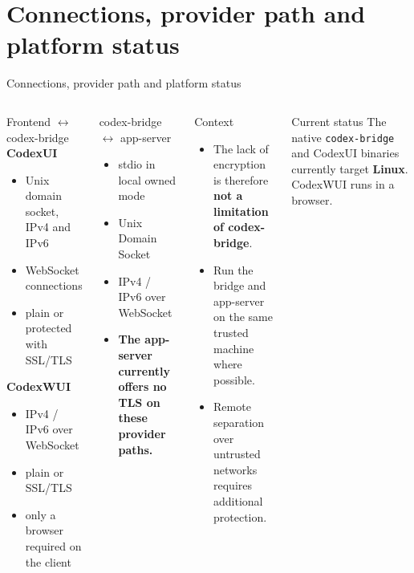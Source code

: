 \documentclass[\fhformat,10pt]{fh-ooe}
\begin{document}
\section{Connections, provider path and platform status}
\begin{frame}{Connections, provider path and platform status}
\footnotesize
\begin{columns}[T]
\begin{block}{Frontend $\leftrightarrow$ codex-bridge}
\textbf{CodexUI}
\begin{itemize}
  \item Unix domain socket, IPv4 and IPv6
  \item WebSocket connections
  \item plain or protected with SSL/TLS
\end{itemize}
\textbf{CodexWUI}
\begin{itemize}
  \item IPv4 / IPv6 over WebSocket
  \item plain or SSL/TLS
  \item only a browser required on the client
\end{itemize}
\end{block}
\begin{block}{codex-bridge $\leftrightarrow$ app-server}
\begin{itemize}
  \item stdio in local owned mode
  \item Unix Domain Socket
  \item IPv4 / IPv6 over WebSocket
  \item \textbf{The app-server currently offers no TLS on these provider paths.}
\end{itemize}
\end{block}
\begin{alertblock}{Context}
\begin{itemize}
  \item The lack of encryption is therefore \textbf{not a limitation of codex-bridge}.
  \item Run the bridge and app-server on the same trusted machine where possible.
  \item Remote separation over untrusted networks requires additional protection.
\end{itemize}
\end{alertblock}
\begin{block}{Current status}
The native \texttt{codex-bridge} and CodexUI binaries currently target \textbf{Linux}. CodexWUI runs in a browser.
\end{block}
\end{columns}
\end{frame}
\end{document}
